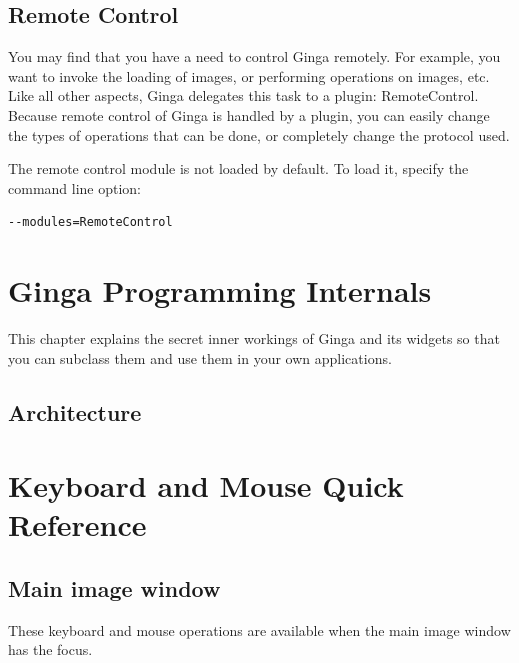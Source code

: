 \documentclass[11pt]{report}
\begin{document}
\section{Remote Control}
\label{sec:remotecontrol}
You may find that you have a need to control Ginga remotely.  For
example, you want to invoke the loading of images, or performing
operations on images, etc.  Like all other aspects, Ginga delegates this
task to a plugin: RemoteControl.  
Because remote control of Ginga is handled by a plugin, you can easily
change the types of operations that can be done, or completely change
the protocol used.

The remote control module is not loaded by default.  To load it, specify
the command line option:
\begin{verbatim}
--modules=RemoteControl
\end{verbatim}

\chapter{Ginga Programming Internals}
\label{ch:internals}
This chapter explains the secret inner workings of Ginga and its widgets
so that you can subclass them and use them in your own applications.

\section{Architecture}

\appendix    %

\chapter{Keyboard and Mouse Quick Reference}
\label{app:mousekbdref}

\section{Main image window}
These keyboard and mouse operations are available when the main image
window has the focus.
\end{document}
